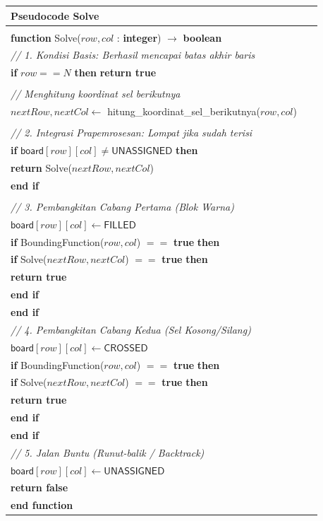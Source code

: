 \documentclass[conference]{IEEEtran}
\begin{document}
\begin{table}[H] 
\centering
\small 
\begin{tabular}{|p{0.95\linewidth}|} 
\hline
\textbf{Pseudocode Solve} \\
\hline
\vspace{-0.5em} \\ 
\textbf{function} \textsf{Solve}($row, col$ : \textbf{integer}) $\rightarrow$ \textbf{boolean} \\
\quad \textit{// 1. Kondisi Basis: Berhasil mencapai batas akhir baris} \\
\quad \textbf{if} $row == N$ \textbf{then} \textbf{return true} \\
\\
\quad \textit{// Menghitung koordinat sel berikutnya} \\
\quad $nextRow, nextCol \leftarrow$ hitung\_koordinat\_sel\_berikutnya($row, col$) \\
\\
\quad \textit{// 2. Integrasi Prapemrosesan: Lompat jika sudah terisi} \\
\quad \textbf{if} $\textsf{board}[row][col] \neq \textsf{UNASSIGNED}$ \textbf{then} \\
\quad \quad \textbf{return} \textsf{Solve}($nextRow, nextCol$) \\
\quad \textbf{end if} \\
\\
\quad \textit{// 3. Pembangkitan Cabang Pertama (Blok Warna)} \\
\quad $\textsf{board}[row][col] \leftarrow \textsf{FILLED}$ \\
\quad \textbf{if} \textsf{BoundingFunction}($row, col$) $==$ \textbf{true} \textbf{then} \\
\quad \quad \textbf{if} \textsf{Solve}($nextRow, nextCol$) $==$ \textbf{true} \textbf{then} \\
\quad \quad \quad \textbf{return true} \\
\quad \quad \textbf{end if} \\
\quad \textbf{end if} \\
\quad \textit{// 4. Pembangkitan Cabang Kedua (Sel Kosong/Silang)} \\
\quad $\textsf{board}[row][col] \leftarrow \textsf{CROSSED}$ \\
\quad \textbf{if} \textsf{BoundingFunction}($row, col$) $==$ \textbf{true} \textbf{then} \\
\quad \quad \textbf{if} \textsf{Solve}($nextRow, nextCol$) $==$ \textbf{true} \textbf{then} \\
\quad \quad \quad \textbf{return true} \\
\quad \quad \textbf{end if} \\
\quad \textbf{end if} \\
\quad \textit{// 5. Jalan Buntu (Runut-balik / Backtrack)} \\
\quad $\textsf{board}[row][col] \leftarrow \textsf{UNASSIGNED}$ \\
\quad \textbf{return false} \\
\textbf{end function} \\


\end{tabular}
\end{table}
\end{document}
